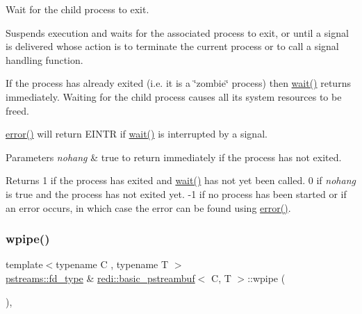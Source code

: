 Wait for the child process to exit. 

Suspends execution and waits for the associated process to exit, or until a signal is delivered whose action is to terminate the current process or to call a signal handling function.

If the process has already exited (i.\+e. it is a \char`\"{}zombie\char`\"{} process) then \mbox{\hyperlink{classredi_1_1basic__pstreambuf_afa976526cfb7ea56e29afbee8ead68e1}{wait()}} returns immediately. Waiting for the child process causes all its system resources to be freed.

\mbox{\hyperlink{classredi_1_1basic__pstreambuf_a87e5bc3b59a7cb3f72fd81ebde783c13}{error()}} will return E\+I\+N\+TR if \mbox{\hyperlink{classredi_1_1basic__pstreambuf_afa976526cfb7ea56e29afbee8ead68e1}{wait()}} is interrupted by a signal.


\begin{DoxyParams}{Parameters}
{\em nohang} & true to return immediately if the process has not exited. \\
\hline
\end{DoxyParams}
\begin{DoxyReturn}{Returns}
1 if the process has exited and \mbox{\hyperlink{classredi_1_1basic__pstreambuf_afa976526cfb7ea56e29afbee8ead68e1}{wait()}} has not yet been called. 0 if {\itshape nohang} is true and the process has not exited yet. -\/1 if no process has been started or if an error occurs, in which case the error can be found using \mbox{\hyperlink{classredi_1_1basic__pstreambuf_a87e5bc3b59a7cb3f72fd81ebde783c13}{error()}}. 
\end{DoxyReturn}
\mbox{\label{classredi_1_1basic__pstreambuf_a982f0dcfc35efedf63c0906611060ba7}} 
\subsubsection{\texorpdfstring{wpipe()}{wpipe()}}
{\footnotesize\ttfamily template$<$typename C , typename T $>$ \\
\mbox{\hyperlink{structredi_1_1pstreams_add0b7eaed16eb6c22a56012958d85b1d}{pstreams\+::fd\+\_\+type}} \& \mbox{\hyperlink{classredi_1_1basic__pstreambuf}{redi\+::basic\+\_\+pstreambuf}}$<$ C, T $>$\+::wpipe (\begin{DoxyParamCaption}{ }\end{DoxyParamCaption})\hspace{0.3cm}{\ttfamily [inline]}, {\ttfamily [protected]}}




